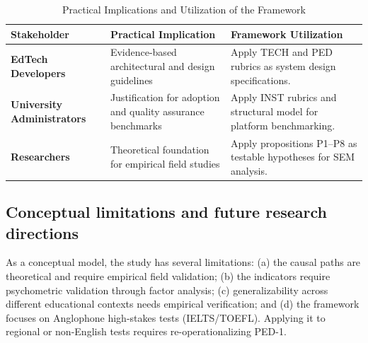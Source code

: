 \documentclass[11pt,a4paper]{article}
\begin{document}
\begin{table}[t]
  \caption{Practical Implications and Utilization of the Framework}
  \label{tab:implications}
  \centering
  \renewcommand{\arraystretch}{1.3}
  \begin{tabular}{@{} L{3.0cm} L{5.5cm} L{5.5cm} @{} }
    \toprule
    \textbf{Stakeholder} & \textbf{Practical Implication} & \textbf{Framework Utilization} \\
    \midrule
    \textbf{EdTech Developers} & Evidence-based architectural and design guidelines & Apply TECH and PED rubrics as system design specifications. \\
    \textbf{University Administrators} & Justification for adoption and quality assurance benchmarks & Apply INST rubrics and structural model for platform benchmarking. \\
    \textbf{Researchers} & Theoretical foundation for empirical field studies & Apply propositions P1--P8 as testable hypotheses for SEM analysis. \\
    \bottomrule
  \end{tabular}
\end{table}

\subsection{Conceptual limitations and future research directions}

As a conceptual model, the study has several limitations: (a) the causal paths are theoretical and require empirical field validation; (b) the indicators require psychometric validation through factor analysis; (c) generalizability across different educational contexts needs empirical verification; and (d) the framework focuses on Anglophone high-stakes tests (IELTS/TOEFL). Applying it to regional or non-English tests requires re-operationalizing PED-1.
\end{document}
